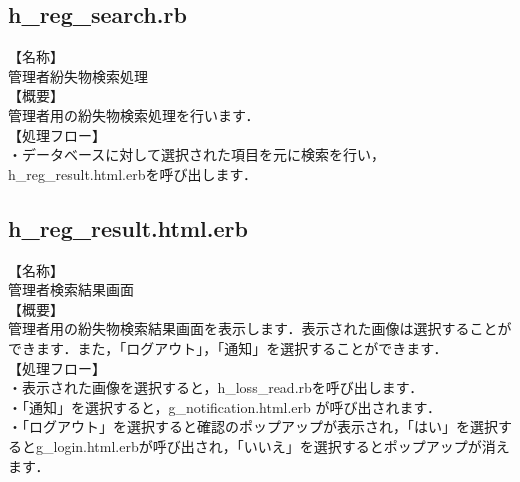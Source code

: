 \documentclass[a4j]{jarticle}
\begin{document}
\subsection{h\_reg\_search.rb}
           【名称】\\
            管理者紛失物検索処理\\
           【概要】\\
            管理者用の紛失物検索処理を行います．\\
           【処理フロー】\\
            ・データベースに対して選択された項目を元に検索を行い，h\_reg\_result.html.erbを呼び出します．\\
\subsection{h\_reg\_result.html.erb}
           【名称】\\
            管理者検索結果画面\\
           【概要】\\
            管理者用の紛失物検索結果画面を表示します．表示された画像は選択することができます．また，「ログアウト」，「通知」を選択することができます．\\
           【処理フロー】\\
            ・表示された画像を選択すると，h\_loss\_read.rbを呼び出します．\\
            ・「通知」を選択すると，g\_notification.html.erb が呼び出されます．\\
            ・「ログアウト」を選択すると確認のポップアップが表示され，「はい」を選択するとg\_login.html.erbが呼び出され，「いいえ」を選択するとポップアップが消えます．\\
\end{document}
